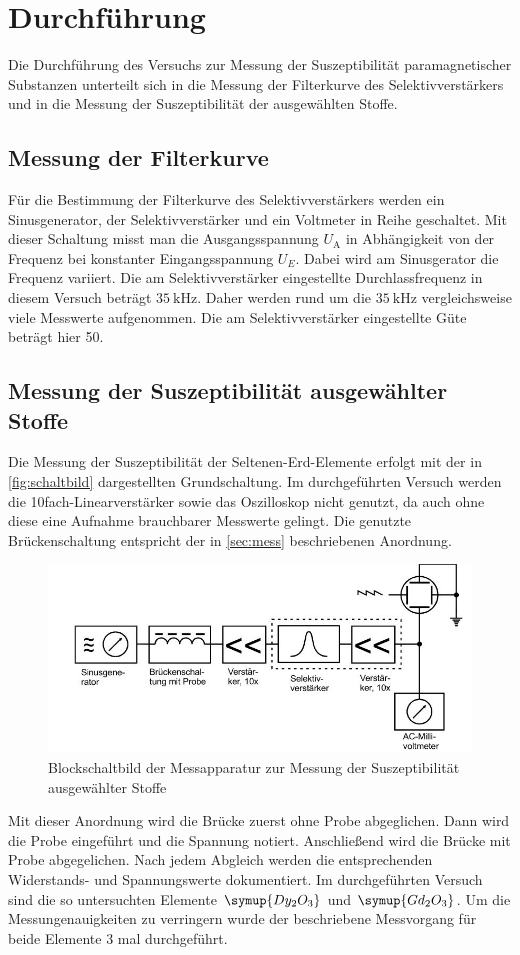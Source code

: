 \section{Durchführung}
\label{sec:Durchführung}
Die Durchführung des Versuchs zur Messung der Suszeptibilität paramagnetischer Substanzen unterteilt sich in die Messung der Filterkurve des Selektivverstärkers und in die Messung der Suszeptibilität der ausgewählten Stoffe.
\subsection{Messung der Filterkurve}
Für die Bestimmung der Filterkurve des Selektivverstärkers werden ein Sinusgenerator, der Selektivverstärker und ein Voltmeter in Reihe geschaltet. Mit dieser Schaltung misst man die Ausgangsspannung $U_\text{A}$ in Abhängigkeit von der Frequenz bei konstanter Eingangsspannung $U_E$. Dabei wird am Sinusgerator die Frequenz variiert. Die am Selektivverstärker eingestellte Durchlassfrequenz in diesem Versuch beträgt $\SI{35}{\kilo\hertz}$. Daher werden rund um die $\SI{35}{\kilo\hertz}$ vergleichsweise viele Messwerte aufgenommen. Die am Selektivverstärker eingestellte Güte beträgt hier 50.
\subsection{Messung der Suszeptibilität ausgewählter Stoffe} 
Die Messung der Suszeptibilität der Seltenen-Erd-Elemente erfolgt mit der in \autoref{fig:schaltbild} dargestellten Grundschaltung. Im durchgeführten Versuch werden die 10fach-Linearverstärker sowie das Oszilloskop nicht genutzt, da auch ohne diese eine Aufnahme brauchbarer Messwerte gelingt. Die genutzte Brückenschaltung entspricht der in \autoref{sec:mess} beschriebenen Anordnung. 
\begin{figure}[H]
    \centering
    \includegraphics[width=\textwidth]{content/schaltbild.jpg}
    \caption{Blockschaltbild der Messapparatur zur Messung der Suszeptibilität ausgewählter Stoffe \cite{versuchsanleitung}}
    \label{fig:schaltbild}
  \end{figure}

  
Mit dieser Anordnung wird die Brücke zuerst ohne Probe abgeglichen. Dann wird die Probe eingeführt und die Spannung notiert. Anschließend wird die Brücke mit Probe abgegelichen. Nach jedem Abgleich werden die entsprechenden Widerstands- und Spannungswerte dokumentiert. Im durchgeführten Versuch sind die so untersuchten Elemente $\symup{Dy_2O_3}$ und $\symup{Gd_2O_3}$. Um die Messungenauigkeiten zu verringern wurde der beschriebene Messvorgang für beide Elemente 3 mal durchgeführt. 

